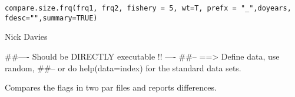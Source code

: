 \documentclass[a4paper]{book}
\begin{document}
%
\begin{Usage}
\begin{verbatim}
compare.size.frq(frq1, frq2, fishery = 5, wt=T, prefx = "_",doyears, fdesc="",summary=TRUE)
\end{verbatim}
\end{Usage}
%
\begin{Arguments}
\begin{ldescription}
\item[\code{frq1}] 


\item[\code{frq2}] 


\item[\code{fishery}] 


\item[\code{wt}] 


\item[\code{prefx}] 


\item[\code{doyears}] 


\item[\code{fdesc}] 


\item[\code{summary}] 


\end{ldescription}
\end{Arguments}
%
\begin{Author}\relax
Nick Davies

\end{Author}
%
\begin{Examples}
\begin{ExampleCode}
##---- Should be DIRECTLY executable !! ----
##-- ==>  Define data, use random,
##--	or do  help(data=index)  for the standard data sets.

\end{ExampleCode}
\end{Examples}
%
\begin{Description}\relax

Compares the flags in two par files and reports differences. 
\end{Description}
\end{document}
